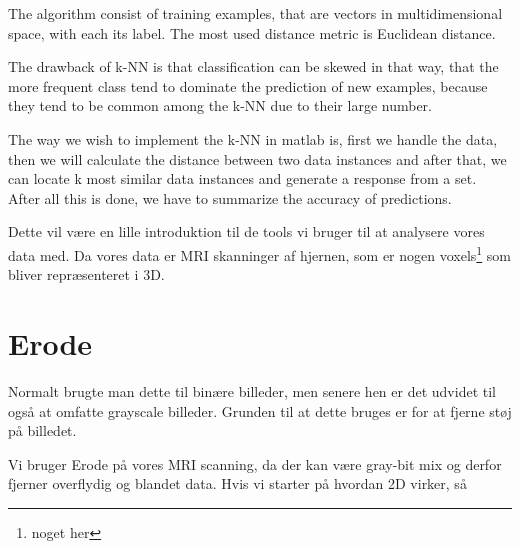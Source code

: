 The algorithm consist of training examples, that are vectors in multidimensional space, with each its label. The most used distance metric is Euclidean distance.

The drawback of k-NN is that classification can be skewed in that way, that the more frequent class tend to dominate the prediction of new examples, because they tend to be common among the k-NN due to their large number.

The way we wish to implement the k-NN in matlab is, first we handle the data, then we will calculate the distance between two data instances and after that, we can locate k most similar data instances and generate a response from a set. After all this is done, we have to summarize the accuracy of predictions.


Dette vil være en lille introduktion til de tools vi bruger til at analysere vores data med. Da vores data er MRI skanninger af hjernen, som er nogen voxels\footnote{noget her} som bliver repræsenteret i 3D.\\



\section{Erode}
Normalt brugte man dette til binære billeder, men senere hen er det udvidet til også at omfatte grayscale billeder. Grunden til at dette bruges er for at fjerne støj på billedet.

Vi bruger Erode på vores MRI scanning, da der kan være gray-bit mix og derfor fjerner overflydig og blandet data. Hvis vi starter på hvordan 2D virker, så

